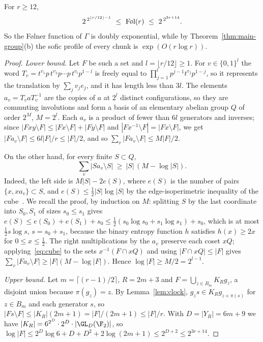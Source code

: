 \begin{proposition}\label{prop:folner-lower}
For $r\ge12$,
\[
2^{\,2^{\lfloor r/12\rfloor-1}}\ \le\ \textup{Føl}(r)\ \le\ 2^{\,2^{3r+14}} .
\]
So the Følner function of $\Gamma$ is doubly exponential, while by Theorem~\ref{thm:main-group}(b) the sofic profile of every chunk is
$\exp(O(r\log r))$.
\end{proposition}

\begin{proof}
\emph{Lower bound.} Let $F$ be such a set and $l=\lfloor r/12\rfloor\ge1$. For $v\in\{0,1\}^l$ the word
$T_v=t^{v_1}p\,t^{v_2}p\cdots p\,t^{v_l}p^{1-l}$ is freely equal to $\prod_{j=1}^lp^{j-1}t^{v_j}p^{1-j}$, so it represents the translation by
$\sum_jv_je_j$, and it has length less than $3l$. The elements $a_v=T_vaT_v^{-1}$ are the copies of $a$ at $2^l$ distinct configurations, so they
are commuting involutions and form a basis of an elementary abelian group $Q$ of order $2^{M}$, $M=2^l$. Each $a_v$ is a product of fewer than
$6l$ generators and inverses; since $|Fxy\setminus F|\le|Fx\setminus F|+|Fy\setminus F|$ and $|Fx^{-1}\setminus F|=|Fx\setminus F|$, we get
$|Fa_v\setminus F|\le6l|F|/r\le|F|/2$, and so $\sum_v|Fa_v\setminus F|\le M|F|/2$.

On the other hand, for every finite $S\subset Q$,
\begin{equation}\label{eq:cube}
\sum_v|Sa_v\setminus S|\ \ge\ |S|\,(M-\log|S|).
\end{equation}
Indeed, the left side is $M|S|-2e(S)$, where $e(S)$ is the number of pairs $\{x,xa_v\}\subset S$, and $e(S)\le\frac12|S|\log|S|$ by the
edge-isoperimetric inequality of the cube~\cite{Harper1964}. We recall the proof, by induction on $M$: splitting $S$ by the last coordinate into
$S_0,S_1$ of sizes $s_0\le s_1$ gives $e(S)\le e(S_0)+e(S_1)+s_0\le\frac12(s_0\log s_0+s_1\log s_1)+s_0$, which is at most $\frac12s\log s$,
$s=s_0+s_1$, because the binary entropy function $h$ satisfies $h(x)\ge2x$ for $0\le x\le\frac12$. The right multiplications by the $a_v$ preserve each coset $xQ$;
applying~\eqref{eq:cube} to the sets $x^{-1}(F\cap xQ)$ and using $|F\cap xQ|\le|F|$ gives $\sum_v|Fa_v\setminus F|\ge|F|(M-\log|F|)$. Hence
$\log|F|\ge M/2=2^{l-1}$.

\emph{Upper bound.} Let $m=\lceil(r-1)/2\rceil$, $R=2m+3$ and $F=\bigcup_{z\in B_m}K_Rg_z$, a disjoint union because $\pi(g_z)=z$. By
Lemma~\ref{lem:clock}, $g_zs\in K_Rg_{z+\pi(s)}$ for $z\in B_m$ and each generator $s$, so $|Fs\setminus F|\le|K_R|(2m+1)=|F|/(2m+1)\le|F|/r$. With
$D=|Y_R|=6m+9$ we have $|K_R|=6^{2^D}\cdot2^D\cdot|\GL_D(\F_2)|$, so $\log|F|\le2^D\log6+D+D^2+2\log(2m+1)\le2^{D+2}\le2^{3r+14}$.
\end{proof}

